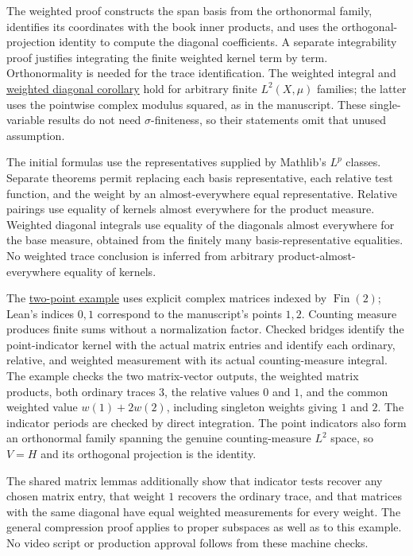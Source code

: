 The weighted proof constructs the span basis from the orthonormal family, identifies its coordinates with the book inner products, and uses the orthogonal-projection identity to compute the diagonal coefficients. A separate integrability proof justifies integrating the finite weighted kernel term by term. Orthonormality is needed for the trace identification. The weighted integral and \hyperref[finite-weighted-diagonal-identity]{weighted diagonal corollary} hold for arbitrary finite $L^2(X,\mu)$ families; the latter uses the pointwise complex modulus squared, as in the manuscript. These single-variable results do not need $\sigma$-finiteness, so their statements omit that unused assumption.

The initial formulas use the representatives supplied by Mathlib's $L^p$ classes. Separate theorems permit replacing each basis representative, each relative test function, and the weight by an almost-everywhere equal representative. Relative pairings use equality of kernels almost everywhere for the product measure. Weighted diagonal integrals use equality of the diagonals almost everywhere for the base measure, obtained from the finitely many basis-representative equalities. No weighted trace conclusion is inferred from arbitrary product-almost-everywhere equality of kernels.

The \hyperref[finite-three-measurements-example]{two-point example} uses explicit complex matrices indexed by $\operatorname{Fin}(2)$; Lean's indices $0,1$ correspond to the manuscript's points $1,2$. Counting measure produces finite sums without a normalization factor. Checked bridges identify the point-indicator kernel with the actual matrix entries and identify each ordinary, relative, and weighted measurement with its actual counting-measure integral. The example checks the two matrix-vector outputs, the weighted matrix products, both ordinary traces $3$, the relative values $0$ and $1$, and the common weighted value $w(1)+2w(2)$, including singleton weights giving $1$ and $2$. The indicator periods are checked by direct integration. The point indicators also form an orthonormal family spanning the genuine counting-measure $L^2$ space, so $V=H$ and its orthogonal projection is the identity.

The shared matrix lemmas additionally show that indicator tests recover any chosen matrix entry, that weight $1$ recovers the ordinary trace, and that matrices with the same diagonal have equal weighted measurements for every weight. The general compression proof applies to proper subspaces as well as to this example. No video script or production approval follows from these machine checks.
